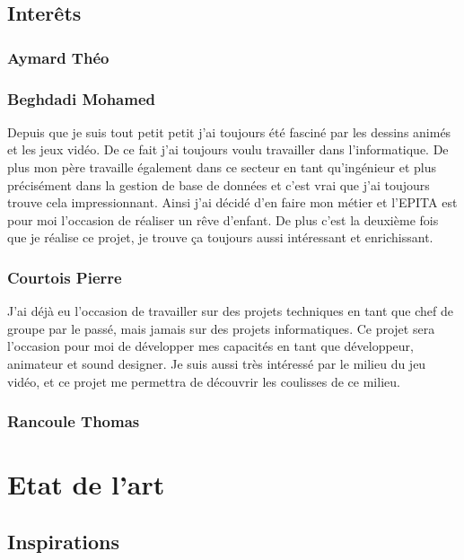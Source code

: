 \documentclass[10pt]{article} %
\begin{document}
\subsection{Interêts}



\subsubsection{Aymard Théo}



\subsubsection{Beghdadi Mohamed}

Depuis que je suis tout petit petit j'ai toujours été fasciné par les dessins animés et les jeux vidéo. De ce fait j'ai toujours voulu travailler dans l'informatique. De plus  mon père travaille également  dans ce secteur en tant qu'ingénieur et plus précisément dans la gestion de base de données et c’est vrai que j’ai toujours trouve cela impressionnant. Ainsi j’ai décidé d’en faire mon métier et l’EPITA est pour moi l’occasion de réaliser un rêve d’enfant. De plus c’est la deuxième fois que je réalise ce projet, je trouve ça toujours aussi intéressant et enrichissant.

\subsubsection{Courtois Pierre}

J'ai déjà eu l'occasion de travailler sur des projets techniques en tant que chef de groupe par le passé, mais jamais sur des projets informatiques. Ce projet sera l'occasion pour moi de développer mes capacités en tant que développeur, animateur et sound designer. Je suis aussi très intéressé par le milieu du jeu vidéo, et ce projet me permettra de découvrir les coulisses de ce milieu.

\subsubsection{Rancoule Thomas}



\section{Etat de l'art}



\subsection{Inspirations}
\end{document}
